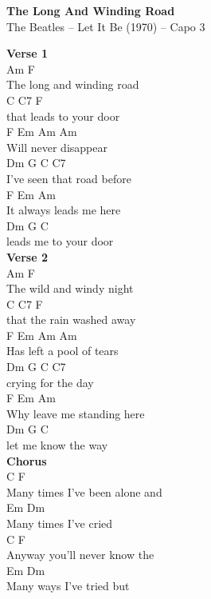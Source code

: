 \documentclass[a4paper]{article}
\begin{document}
    \begin{center}
        \textbf{The Long And Winding Road}
        ~\\
        The Beatles -- Let It Be (1970)
         -- Capo 3
    \end{center}
    {
        \scriptsize
        \textbf{Verse 1}
        ~\\
        {
            \cutive
            \obeyspaces
       Am                 F
\\
   The long and winding road 
\\
         C     C7        F
\\
   that leads to your door
\\
 F       Em       Am    Am
\\
   Will never disappear
\\
 Dm               G        C   C7
\\
   I've seen that road before 
\\
 F       Em        Am  
\\
   It always leads me here
\\
 Dm         G       C  
\\
   leads me to your door
\\

        }
        \textbf{Verse 2}
        ~\\
        {
            \cutive
            \obeyspaces
       Am                 F
\\
   The wild and windy night 
\\
         C     C7        F
\\
   that the rain washed away
\\
 F       Em       Am    Am
\\
   Has left a pool of tears 
\\
 Dm               G        C   C7
\\
   crying for the day
\\
 F       Em        Am  
\\
   Why leave me standing here
\\
 Dm         G       C  
\\
   let me know the way
\\

        }
        \textbf{Chorus}
        ~\\
        {
            \cutive
            \obeyspaces
   C                F                       
\\
   Many times I've been alone and 
\\
   Em             Dm
\\
   Many times I've cried 
\\
   C               F
\\
   Anyway you'll never know the 
\\
   Em            Dm
\\
   Many ways I've tried but
\\

}}
\end{document}
